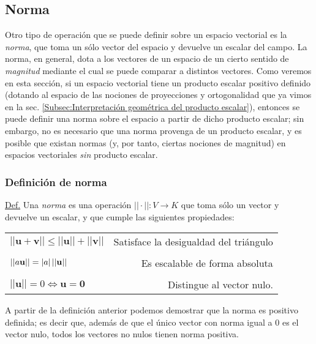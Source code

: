 \documentclass[12pt,dvipsnames]{article}
\begin{document}
\newpage
\subsection{Norma} \label{Subsec:Norma}

Otro tipo de operación que se puede definir sobre un espacio vectorial es la \emph{norma}, que toma un sólo vector del espacio y devuelve un escalar del campo. La norma, en general, dota a los vectores de un espacio de un cierto sentido de \emph{magnitud} mediante el cual se puede comparar a distintos vectores. Como veremos en esta sección, si un espacio vectorial tiene un producto escalar positivo definido (dotando al espacio de las nociones de proyecciones y ortogonalidad que ya vimos en la sec. \ref{Subsec:Interpretación geométrica del producto escalar}), entonces se puede definir una norma sobre el espacio a partir de dicho producto escalar; sin embargo, no es necesario que una norma provenga de un producto escalar, y es posible que existan normas (y, por tanto, ciertas nociones de magnitud) en espacios vectoriales \emph{sin} producto escalar.

\subsubsection{Definición de norma} \label{Def:Norma}

\begin{tcolorbox}
\underline{Def.} Una \textit{norma} es una operación $||\cdot||:V\rightarrow K$ que toma sólo un vector y devuelve un escalar, y que cumple las siguientes propiedades:

\begin{center}
    \begin{tabular}{lr}
        $||\mathbf{u}+\mathbf{v}|| \leq ||\mathbf{u}|| + ||\mathbf{v}||$ & Satisface la desigualdad del triángulo \\ \\
        $||a\mathbf{u}|| = |a|\hspace{0.5mm}||\mathbf{u}||$ & Es escalable de forma absoluta \\ \\
        $||\mathbf{u}||=0\iff \mathbf{u}=\mathbf{0}$ & Distingue al vector nulo.
    \end{tabular}
\end{center}

\end{tcolorbox}{}

\vspace{3mm}
\noindent A partir de la definición anterior podemos demostrar que la norma es positivo definida; es decir que, además de que el único vector con norma igual a $0$ es el vector nulo, todos los vectores no nulos tienen norma positiva.
\end{document}
